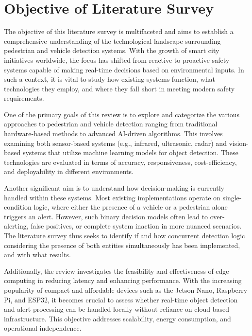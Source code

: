 \documentclass[a4paper, 12pt]{report}
\begin{document}
\section{Objective of Literature Survey}
The objective of this literature survey is multifaceted and aims to establish a comprehensive understanding of the technological landscape surrounding pedestrian and vehicle detection systems. With the growth of smart city initiatives worldwide, the focus has shifted from reactive to proactive safety systems capable of making real-time decisions based on environmental inputs. In such a context, it is vital to study how existing systems function, what technologies they employ, and where they fall short in meeting modern safety requirements.

One of the primary goals of this review is to explore and categorize the various approaches to pedestrian and vehicle detection ranging from traditional hardware-based methods to advanced AI-driven algorithms. This involves examining both sensor-based systems (e.g., infrared, ultrasonic, radar) and vision-based systems that utilize machine learning models for object detection. These technologies are evaluated in terms of accuracy, responsiveness, cost-efficiency, and deployability in different environments.

Another significant aim is to understand how decision-making is currently handled within these systems. Most existing implementations operate on single-condition logic, where either the presence of a vehicle or a pedestrian alone triggers an alert. However, such binary decision models often lead to over-alerting, false positives, or complete system inaction in more nuanced scenarios. The literature survey thus seeks to identify if and how concurrent detection logic considering the presence of both entities simultaneously has been implemented, and with what results.

Additionally, the review investigates the feasibility and effectiveness of edge computing in reducing latency and enhancing performance. With the increasing popularity of compact and affordable devices such as the Jetson Nano, Raspberry Pi, and ESP32, it becomes crucial to assess whether real-time object detection and alert processing can be handled locally without reliance on cloud-based infrastructure. This objective addresses scalability, energy consumption, and operational independence.
\end{document}
